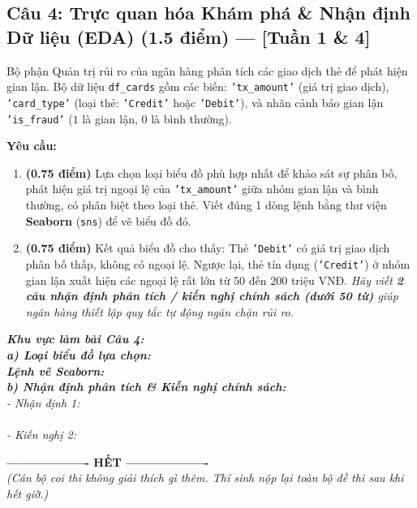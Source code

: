 \documentclass[11pt,a4paper]{article}
\newcommand{\answerbox}[2]{
  \vspace{1mm}
  \begin{tcolorbox}[
    colback=white,
    colframe=gray!60,
    boxrule=0.6pt,
    arc=2pt,
    height=#1,
    left=3mm, right=3mm, top=2mm, bottom=2mm
  ]
  \small\textit{\color{gray}#2}
  \end{tcolorbox}
  \vspace{1mm}
}
\begin{document}
\subsection*{Câu 4: Trực quan hóa Khám phá \& Nhận định Dữ liệu (EDA) (1.5 điểm) --- [Tuần 1 \& 4]}
Bộ phận Quản trị rủi ro của ngân hàng phân tích các giao dịch thẻ để phát hiện gian lận. Bộ dữ liệu \texttt{df\_cards} gồm các biến: \texttt{'tx\_amount'} (giá trị giao dịch), \texttt{'card\_type'} (loại thẻ: \texttt{'Credit'} hoặc \texttt{'Debit'}), và nhãn cảnh báo gian lận \texttt{'is\_fraud'} ($1$ là gian lận, $0$ là bình thường).

\noindent
\textbf{Yêu cầu:}
\begin{enumerate}[label=\textbf{\alph*)}]
  \item \textbf{(0.75 điểm)} Lựa chọn loại biểu đồ phù hợp nhất để khảo sát sự phân bố, phát hiện giá trị ngoại lệ của \texttt{'tx\_amount'} giữa nhóm gian lận và bình thường, có phân biệt theo loại thẻ. Viết đúng 1 dòng lệnh bằng thư viện \textbf{Seaborn} (\texttt{sns}) để vẽ biểu đồ đó.
  \item \textbf{(0.75 điểm)} Kết quả biểu đồ cho thấy: Thẻ \texttt{'Debit'} có giá trị giao dịch phân bố thấp, không có ngoại lệ. Ngược lại, thẻ tín dụng (\texttt{'Credit'}) ở nhóm gian lận xuất hiện các ngoại lệ rất lớn từ 50 đến 200 triệu VNĐ.  
  \textit{Hãy viết \textbf{2 câu nhận định phân tích / kiến nghị chính sách (dưới 50 từ)} giúp ngân hàng thiết lập quy tắc tự động ngăn chặn rủi ro.}
\end{enumerate}

\answerbox{5.0cm}{
\textbf{Khu vực làm bài Câu 4:}\\[1.5mm]
\textbf{a) Loại biểu đồ lựa chọn:} \dotfill\\[2mm]
\textbf{Lệnh vẽ Seaborn:} \dotfill\\[3mm]
\textbf{b) Nhận định phân tích \& Kiến nghị chính sách:}\\
- Nhận định 1: \dotfill\\[2mm]
\hspace*{2.2cm}\dotfill\\[2mm]
- Kiến nghị 2: \dotfill\\[2mm]
\hspace*{2.2cm}\dotfill
}

\vspace{1mm}
\begin{center}
\textbf{------------------- HẾT -------------------}\\
\textit{\small (Cán bộ coi thi không giải thích gì thêm. Thí sinh nộp lại toàn bộ đề thi sau khi hết giờ.)}
\end{center}
\end{document}
